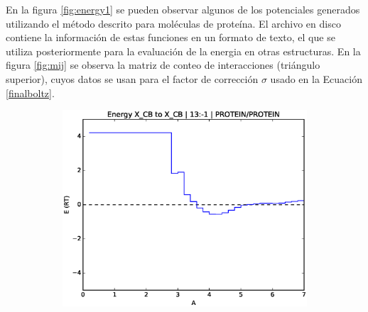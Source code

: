 \par
En la figura \ref{fig:energy1} se pueden observar algunos de los potenciales generados utilizando el método descrito para moléculas de proteína. 
El archivo en disco contiene la información de estas funciones en un formato de texto, el que se utiliza posteriormente para la evaluación de la energia en otras estructuras.
En la figura \ref{fig:mij} se observa la matriz de conteo de interacciones (triángulo superior), cuyos datos se usan para el factor de corrección $\sigma$ usado en la Ecuación \ref{finalboltz}.
\clearpage
\begin{figure}[p]
\centering
\begin{subfigure}{.8\textwidth}
\centering
\includegraphics[width=\textwidth]{figures/prot_pot/eps_graphs/cb2cb.eps}
\caption{}
\end{subfigure}


\end{figure}
